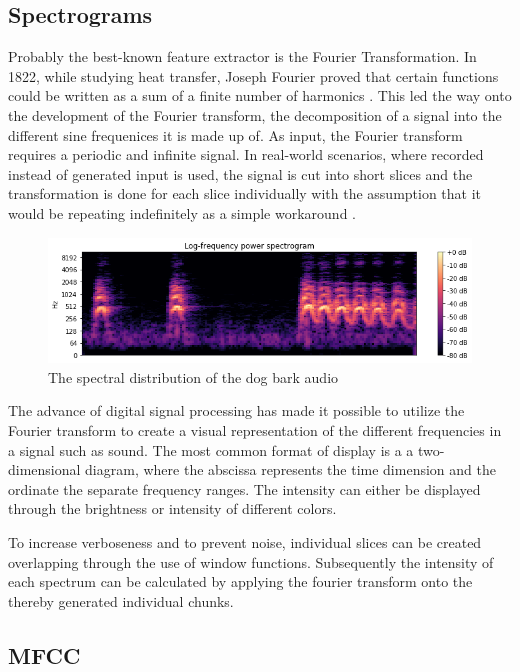 \subsection{Spectrograms}

Probably the best-known feature extractor is the Fourier Transformation. In 1822, while studying heat transfer, Joseph Fourier proved that certain functions could be written as a sum of a finite number of harmonics \cite{fourier1878}. This led the way onto the development of the Fourier transform, the decomposition of a signal into the different sine frequenices it is made up of. As input, the Fourier transform requires a periodic and infinite signal. In real-world scenarios, where recorded instead of generated input is used, the signal is cut into short slices and the transformation is done for each slice individually with the assumption that it would be repeating indefinitely as a simple workaround \cite{Smith97}.

\begin{figure}[h]
    \centering
	\includegraphics[width=.9\textwidth]{./images/illustrations/spectrogram}
    \caption{The spectral distribution of the dog bark audio}
    \label{fig:spef}
\end{figure}


The advance of digital signal processing has made it possible to utilize the Fourier transform to create a visual representation of the different frequencies in a signal such as sound. The most common format of display is a a two-dimensional diagram, where the abscissa represents the time dimension and the ordinate the separate frequency ranges. The intensity can either be displayed through the brightness or intensity of different colors. 

To increase verboseness and to prevent noise, individual slices can be created overlapping through the use of window functions. Subsequently the intensity of each spectrum can be calculated by applying the fourier transform onto the thereby generated individual chunks.


\subsection{MFCC}

